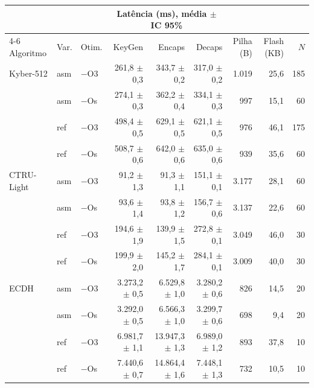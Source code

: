 \begin{tabular}{@{}lllrrrrrr@{}}
\toprule
 & & & \multicolumn{3}{c}{Latência (ms), média $\pm$ IC 95\%} & & & \\
\cmidrule(lr){4-6}
Algoritmo & Var. & Otim. & KeyGen & Encaps & Decaps & Pilha (B) & Flash (KB) & $N$ \\
\midrule
Kyber-512 & asm & $-$O3 & 261,8 $\pm$ 0,3 & 343,7 $\pm$ 0,2 & 317,0 $\pm$ 0,2 & 1.019 & 25,6 & 185 \\
 & asm & $-$Os & 274,1 $\pm$ 0,3 & 362,2 $\pm$ 0,4 & 334,1 $\pm$ 0,3 & 997 & 15,1 & 60 \\
 & ref & $-$O3 & 498,4 $\pm$ 0,5 & 629,1 $\pm$ 0,5 & 621,1 $\pm$ 0,5 & 976 & 46,1 & 175 \\
 & ref & $-$Os & 508,7 $\pm$ 0,6 & 642,0 $\pm$ 0,6 & 635,0 $\pm$ 0,6 & 939 & 35,6 & 60 \\
\addlinespace
CTRU-Light & asm & $-$O3 & 91,2 $\pm$ 1,3 & 91,3 $\pm$ 1,1 & 151,1 $\pm$ 0,1 & 3.177 & 28,1 & 60 \\
 & asm & $-$Os & 93,6 $\pm$ 1,4 & 93,8 $\pm$ 1,2 & 156,7 $\pm$ 0,6 & 3.137 & 22,6 & 60 \\
 & ref & $-$O3 & 194,6 $\pm$ 1,9 & 139,9 $\pm$ 1,5 & 272,8 $\pm$ 0,1 & 3.049 & 46,0 & 30 \\
 & ref & $-$Os & 199,9 $\pm$ 2,0 & 145,2 $\pm$ 1,7 & 284,1 $\pm$ 0,1 & 3.009 & 40,0 & 30 \\
\addlinespace
ECDH & asm & $-$O3 & 3.273,2 $\pm$ 0,5 & 6.529,8 $\pm$ 1,0 & 3.280,2 $\pm$ 0,6 & 826 & 14,5 & 20 \\
 & asm & $-$Os & 3.292,0 $\pm$ 0,5 & 6.566,3 $\pm$ 1,0 & 3.299,7 $\pm$ 0,6 & 698 & 9,4 & 20 \\
 & ref & $-$O3 & 6.981,7 $\pm$ 1,1 & 13.947,3 $\pm$ 1,3 & 6.989,0 $\pm$ 1,2 & 893 & 37,8 & 10 \\
 & ref & $-$Os & 7.440,6 $\pm$ 0,7 & 14.864,4 $\pm$ 1,6 & 7.448,1 $\pm$ 1,3 & 732 & 10,5 & 10 \\
\bottomrule
\end{tabular}
